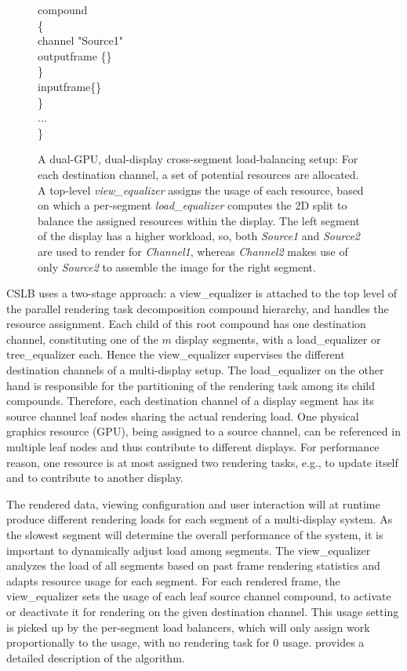 \begin{figure}[h!t]
{\begin{minipage}[b]{0.46\textwidth}
{\quad \quad compound \\
\quad \quad \{  \\
\quad \quad \quad channel "Source1"  \\
\quad \quad \quad outputframe \{\}  \\
\quad \quad \} \\
\quad \quad inputframe\{\} \\
\quad \} \\
\quad ... \\
\} \\
	\label{fViewEqualizerConfig}}
	\end{minipage}
   }
\caption{A dual-GPU, dual-display cross-segment load-balancing setup: For each destination channel, a set of potential resources are allocated. A top-level {\em view\_equalizer} assigns the usage of each resource, based on which a per-segment {\em load\_equalizer} computes the 2D split to balance the assigned resources within the display. The left segment of the display has a higher workload, so, both {\em Source1} and {\em Source2} are used to render for {\em Channel1}, whereas {\em Channel2} makes use of only {\em Source2} to assemble the image for the right segment.}
\label{fViewEqualizer}
\end{figure}

CSLB uses a two-stage approach: a {\sf view\_equalizer} is attached to the top
level of the parallel rendering task decomposition compound hierarchy, and
handles the resource assignment. Each child of this root compound has one
destination channel, constituting one of the $m$ display segments, with a {\sf
load\_equalizer} or \textsf{tree\_equalizer} each. Hence the {\sf
view\_equalizer} supervises the different destination channels of a
multi-display setup. The {\sf load\_equalizer} on the other hand is
responsible for the partitioning of the rendering task among its child
compounds. Therefore, each destination channel of a display segment has its
source channel leaf nodes sharing the actual rendering load. One physical
graphics resource (GPU), being assigned to a source channel, can be referenced
in multiple leaf nodes and thus contribute to different displays. For
performance reason, one resource is at most assigned two rendering tasks, e.g.,
to update itself and to contribute to another display.

The rendered data, viewing configuration and user interaction will at runtime
produce different rendering loads for each segment of a multi-display system. As
the slowest segment will determine the overall performance of the system, it is
important to dynamically adjust load among segments. The {\sf view\_equalizer}
analyzes the load of all segments based on past frame rendering statistics and
adapts resource usage for each segment. For each rendered frame, the {\sf
view\_equalizer} sets the usage of each leaf source channel compound, to
activate or deactivate it for rendering on the given destination channel. This
usage setting is picked up by the per-segment load balancers, which will only
assign work proportionally to the usage, with no rendering task for $0$ usage.
\cite{EEP:11} provides a detailed description of the algorithm.

